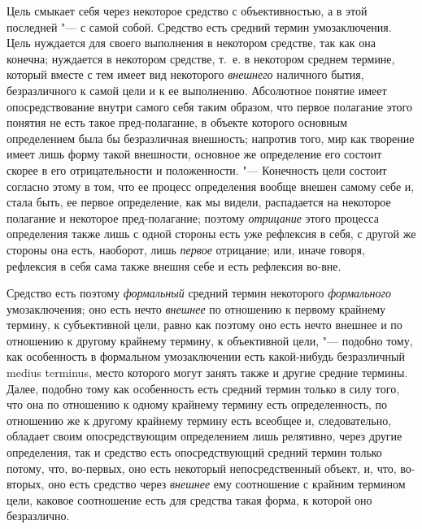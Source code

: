 Цель смыкает себя через некоторое средство с объективностью, а
в этой последней "--- с самой собой. Средство есть средний
термин умозаключения. Цель нуждается для своего выполнения в некотором
средстве, так как она конечна; нуждается в некотором средстве, т.~е. в
некотором среднем термине, который вместе с тем имеет вид некоторого
{\em внешнего} наличного
бытия, безразличного к самой цели и к ее выполнению. Абсолютное понятие
имеет опосредствование внутри самого себя таким образом, что первое
полагание этого понятия не есть такое пред-полагание, в объекте
которого основным определением была бы безразличная внешность; напротив
того, мир как творение имеет лишь форму такой внешности, основное же
определение его состоит скорее в его отрицательности и положенности. "---
Конечность цели состоит согласно этому в том, что ее процесс
определения вообще внешен самому себе и, стала быть, ее первое определение,
как мы видели, распадается на некоторое полагание и некоторое
пред-полагание; поэтому {\em отрицание}
этого процесса определения также лишь с одной стороны есть
уже рефлексия в себя, с другой же стороны она есть, наоборот, лишь
{\em первое} отрицание;
или, иначе говоря, рефлексия в себя сама также внешня себе и есть рефлексия
во-вне.

Средство есть поэтому
{\em формальный} средний
термин некоторого {\em формального}
умозаключения; оно есть нечто
{\em внешнее} по
отношению к первому крайнему термину, к субъективной цели, равно как
поэтому оно есть нечто внешнее и по отношению к другому крайнему термину, к
объективной цели, "--- подобно тому, как особенность в
формальном умозаключении есть какой-нибудь безразличный medius terminus,
место которого могут занять также и другие средние термины.
Далее, подобно тому как особенность есть средний термин только в силу того,
что она по отношению к одному крайнему термину есть определенность, по
отношению же к другому крайнему термину есть всеобщее и, следовательно,
обладает своим опосредствующим определением лишь релятивно, через другие
определения, так и средство есть опосредствующий средний
термин только потому, что, во-первых, оно есть некоторый непосредственный
объект, и, что, во-вторых, оно есть средство через
{\em внешнее} ему
соотношение с крайним термином цели, каковое соотношение есть для средства
такая форма, к которой оно безразлично.

